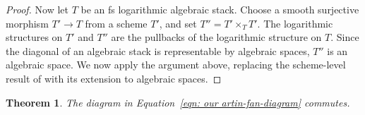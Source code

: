 \documentclass{article}
\newtheorem{theorem}[definition]{Theorem}
\begin{document}
\begin{proof}
Now let $T$ be an fs logarithmic algebraic stack. Choose a
smooth surjective morphism
$
T'\longrightarrow T
$
from a scheme $T'$, and set
$
T''=T'\times_T T'.
$
The logarithmic structures on $T'$ and $T''$ are the pullbacks of the
logarithmic structure on $T$. Since the diagonal of an algebraic stack
is representable by algebraic spaces, $T''$ is an algebraic space. We now apply the argument above, replacing the scheme-level result of \cite[Proposition 2.10]{ACGSI} with its extension to algebraic spaces.

\end{proof}





\begin{theorem}\label{thm: commutative diagram for mapping spaces}
    The diagram in Equation~\eqref{eqn: our artin-fan-diagram} commutes.
\end{theorem}
\end{document}
